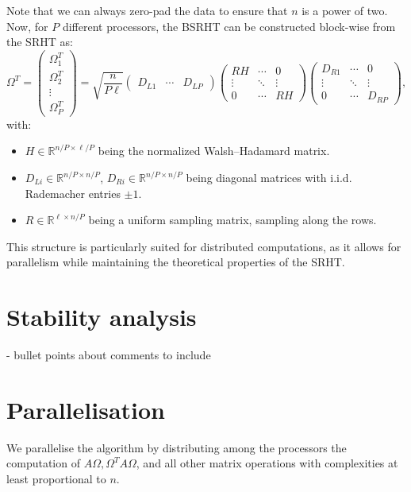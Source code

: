 \documentclass[a4paper, 12pt,oneside]{article}
\begin{document}
Note that we can always zero-pad the data to ensure that $n$ is a power of two. Now, for $P$ different processors, the BSRHT can be constructed block-wise from the SRHT as:
\[
\Omega^T = \begin{pmatrix} \Omega_1^T \\
\Omega_2^T \\
\vdots \\
\Omega_P^T \end{pmatrix} = \sqrt{\frac{n}{P\ell}} \begin{pmatrix} D_{L1} & \cdots & D_{LP} \end{pmatrix}
\begin{pmatrix}
RH & \cdots & 0 \\
\vdots & \ddots & \vdots \\
0 & \cdots & RH
\end{pmatrix}
\begin{pmatrix} D_{R1} & \cdots & 0 \\
\vdots & \ddots & \vdots \\
0 & \cdots & D_{RP} \end{pmatrix}, \tag{2}
\]
with:
\begin{itemize}
  \item $H \in \mathbb{R}^{n/P \times \ell/P}$ being the normalized Walsh--Hadamard matrix.
  \item $D_{Li} \in \mathbb{R}^{n/P \times n/P}$, $D_{Ri} \in \mathbb{R}^{n/P \times n/P}$ being diagonal matrices with i.i.d. Rademacher entries $\pm 1$.
  \item $R \in \mathbb{R}^{\ell \times n/P}$ being a uniform sampling matrix, sampling along the rows.
\end{itemize}

This structure is particularly suited for distributed computations, as it allows for parallelism while maintaining the theoretical properties of the SRHT.


	\section{Stability analysis}
		- bullet points about comments to include 
	\section{Parallelisation}
	We parallelise the algorithm by distributing among the processors the computation of $A \Omega,\Omega^T A \Omega$, and all other matrix operations with complexities at least proportional to $n$. 
	
\end{document}
